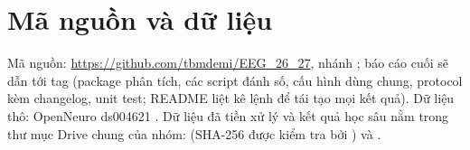 \section{Mã nguồn và dữ liệu}
\label{ch:availability}

Mã nguồn: \url{https://github.com/tbmdemi/EEG_26_27}, nhánh ; báo cáo cuối sẽ dẫn tới tag  (package phân tích, các script đánh số, cấu hình dùng chung, protocol kèm changelog, unit test; README liệt kê lệnh để tái tạo mọi kết quả). Dữ liệu thô: OpenNeuro ds004621 \citep{dzianok2022data}. Dữ liệu đã tiền xử lý và kết quả học sâu nằm trong thư mục Drive chung của nhóm:  (SHA-256 được kiểm tra bởi ) và .
